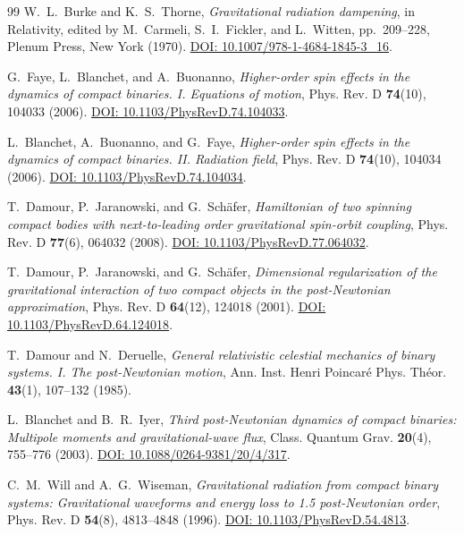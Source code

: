 \documentclass[11pt,a4paper,reqno]{article}
\theoremstyle{plain}
\theoremstyle{definition}
\theoremstyle{remark}
\numberwithin{equation}{section}
\begin{document}
\begin{thebibliography}{99}
W.~L.~Burke and K.~S.~Thorne, \textit{Gravitational radiation dampening}, in Relativity, edited by M.~Carmeli, S.~I.~Fickler, and L.~Witten, pp.~209--228, Plenum Press, New York (1970). \href{https://doi.org/10.1007/978-1-4684-1845-3_16}{DOI: 10.1007/978-1-4684-1845-3\_16}.

G.~Faye, L.~Blanchet, and A.~Buonanno, \textit{Higher-order spin effects in the dynamics of compact binaries. I. Equations of motion}, Phys. Rev. D \textbf{74}(10), 104033 (2006). \href{https://doi.org/10.1103/PhysRevD.74.104033}{DOI: 10.1103/PhysRevD.74.104033}.

L.~Blanchet, A.~Buonanno, and G.~Faye, \textit{Higher-order spin effects in the dynamics of compact binaries. II. Radiation field}, Phys. Rev. D \textbf{74}(10), 104034 (2006). \href{https://doi.org/10.1103/PhysRevD.74.104034}{DOI: 10.1103/PhysRevD.74.104034}.

T.~Damour, P.~Jaranowski, and G.~Sch{\"a}fer, \textit{Hamiltonian of two spinning compact bodies with next-to-leading order gravitational spin-orbit coupling}, Phys. Rev. D \textbf{77}(6), 064032 (2008). \href{https://doi.org/10.1103/PhysRevD.77.064032}{DOI: 10.1103/PhysRevD.77.064032}.

T.~Damour, P.~Jaranowski, and G.~Sch{\"a}fer, \textit{Dimensional regularization of the gravitational interaction of two compact objects in the post-Newtonian approximation}, Phys. Rev. D \textbf{64}(12), 124018 (2001). \href{https://doi.org/10.1103/PhysRevD.64.124018}{DOI: 10.1103/PhysRevD.64.124018}.

T.~Damour and N.~Deruelle, \textit{General relativistic celestial mechanics of binary systems. I. The post-Newtonian motion}, Ann. Inst. Henri Poincar{\'e} Phys. Th{\'e}or. \textbf{43}(1), 107--132 (1985).

L.~Blanchet and B.~R.~Iyer, \textit{Third post-Newtonian dynamics of compact binaries: Multipole moments and gravitational-wave flux}, Class. Quantum Grav. \textbf{20}(4), 755--776 (2003). \href{https://doi.org/10.1088/0264-9381/20/4/317}{DOI: 10.1088/0264-9381/20/4/317}.

C.~M.~Will and A.~G.~Wiseman, \textit{Gravitational radiation from compact binary systems: Gravitational waveforms and energy loss to 1.5 post-Newtonian order}, Phys. Rev. D \textbf{54}(8), 4813--4848 (1996). \href{https://doi.org/10.1103/PhysRevD.54.4813}{DOI: 10.1103/PhysRevD.54.4813}.


\end{thebibliography}
\end{document}
